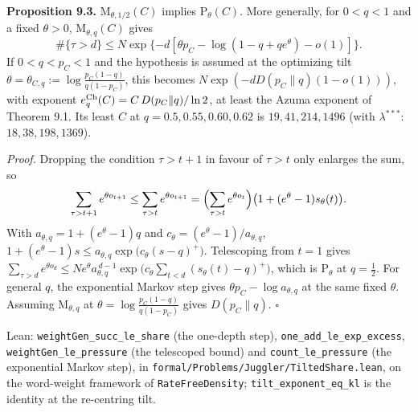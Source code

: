 \documentclass[11pt,a4paper]{article}
\begin{document}
\textbf{Proposition 9.3.} \(\mathrm M_{\theta,1/2}(C)\) implies
\(\mathrm P_\theta(C)\). More generally, for \(0<q<1\) and a fixed
\(\theta>0\), \(\mathrm M_{\theta,q}(C)\) gives \[
\#\{\tau>d\}\le
N\exp\{-d[\theta p_C-\log(1-q+qe^\theta)-o(1)]\}.
\] If \(0<q<p_C<1\) and the hypothesis is assumed at the optimizing tilt
\(\theta=\theta_{C,q}:=\log\frac{p_C(1-q)}{q(1-p_C)}\), this becomes
\(N\exp(-dD(p_C\|q)(1-o(1)))\), with exponent
\(e_q^{\rm Ch}(C)=C\,D(p_C\|q)/\ln 2\), at least the Azuma exponent of
Theorem 9.1. Its least \(C\) at \(q=0.5,0.55,0.60,0.62\) is
\(19,41,214,1496\) (with \(\lambda^{***}\): \(18,38,198,1369\)).

\emph{Proof.} Dropping the condition \(\tau>t+1\) in favour of
\(\tau>t\) only enlarges the sum, so \[
\sum_{\tau>t+1}e^{\theta o_{t+1}}\le\sum_{\tau>t}e^{\theta o_{t+1}}
=\Bigl(\sum_{\tau>t}e^{\theta o_t}\Bigr)\bigl(1+(e^{\theta}-1)s_\theta(t)\bigr).
\] With \(a_{\theta,q}=1+(e^\theta-1)q\) and
\(c_\theta=(e^\theta-1)/a_{\theta,q}\),
\(1+(e^\theta-1)s\le a_{\theta,q}\exp\bigl(c_\theta(s-q)^+\bigr)\).
Telescoping from \(t=1\) gives
\(\sum_{\tau>d}e^{\theta o_d}\le Ne^{\theta}a_{\theta,q}^{\,d-1}\exp\bigl(c_\theta\sum_{t<d}(s_\theta(t)-q)^+\bigr)\),
which is \(\mathrm P_\theta\) at \(q=\tfrac12\). For general \(q\), the
exponential Markov step gives \(\theta p_C-\log a_{\theta,q}\) at the
same fixed \(\theta\). Assuming \(\mathrm M_{\theta,q}\) at
\(\theta=\log\frac{p_C(1-q)}{q(1-p_C)}\) gives \(D(p_C\|q)\).
\(\square\)

Lean: \texttt{\nolinkurl{weightGen_succ_le_share}} (the one-depth step),
\texttt{\nolinkurl{one_add_le_exp_excess}},
\texttt{\nolinkurl{weightGen_le_pressure}} (the telescoped bound) and
\texttt{\nolinkurl{count_le_pressure}} (the exponential Markov step), in
\texttt{\nolinkurl{formal/Problems/Juggler/TiltedShare.lean}}, on the
word-weight framework of \texttt{\nolinkurl{RateFreeDensity}};
\texttt{\nolinkurl{tilt_exponent_eq_kl}} is the identity at the
re-centring tilt.
\end{document}
